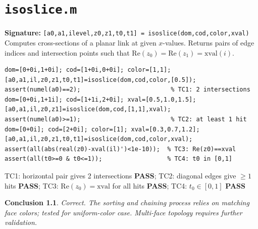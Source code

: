 \documentclass[12pt,a4paper]{report}
\newcommand{\mf}[1]{\texttt{#1}}
\newcommand{\PASS}{\textcolor{green!60!black}{\textbf{PASS}}}
\newtheorem{concl}{Conclusion}[chapter]
\begin{document}
\chapter{\mf{isoslice.m}}
\begin{tcolorbox}[Abox,title=Analysis]
\textbf{Signature:} \lstinline|[a0,a1,ilevel,z0,z1,t0,t1] = isoslice(dom,cod,color,xval)|\quad
Computes cross-sections of a planar link at given $x$-values. Returns pairs of edge indices and intersection points such that $\mathrm{Re}(z_0)=\mathrm{Re}(z_1)=\mbox{xval}(i)$.
\end{tcolorbox}
\begin{lstlisting}[caption={Tests for isoslice.m}]
dom=[0+0i,1+0i]; cod=[1+0i,0+0i]; color=[1,1];
[a0,a1,il,z0,z1,t0,t1]=isoslice(dom,cod,color,[0.5]);
assert(numel(a0)==2);                         % TC1: 2 intersections
dom=[0+0i,1+1i]; cod=[1+1i,2+0i]; xval=[0.5,1.0,1.5];
[a0,a1,il,z0,z1]=isoslice(dom,cod,[1,1],xval);
assert(numel(a0)>=1);                         % TC2: at least 1 hit
dom=[0+0i]; cod=[2+0i]; color=[1]; xval=[0.3,0.7,1.2];
[a0,a1,il,z0,z1,t0,t1]=isoslice(dom,cod,color,xval);
assert(all(abs(real(z0)-xval(il)')<1e-10));  % TC3: Re(z0)==xval
assert(all(t0>=0 & t0<=1));                  % TC4: t0 in [0,1]
\end{lstlisting}
\begin{tcolorbox}[Pbox,title=TC1--TC4 -- All pass]
TC1: horizontal pair gives 2 intersections \PASS; TC2: diagonal edges give $\geq1$ hits \PASS; TC3: $\mathrm{Re}(z_0)=\mathrm{xval}$ for all hits \PASS; TC4: $t_0\in[0,1]$ \PASS
\end{tcolorbox}
\begin{concl}
Correct. The sorting and chaining process relies on matching face colors; tested for uniform-color case. Multi-face topology requires further validation.
\end{concl}

\end{document}

